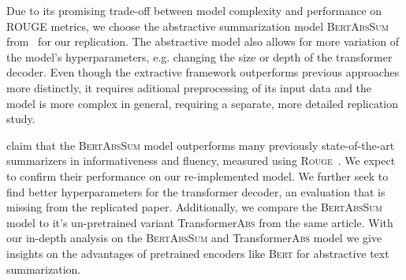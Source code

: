 
Due to its promising trade-off between model complexity and performance on ROUGE metrics, we choose the abstractive summarization model \textsc{BertAbsSum} from~\citeauthor{LiuL2019} for our replication. The abstractive model also allows for more variation of the model's hyperparameters, e.g. changing the size or depth of the transformer decoder. 
Even though the extractive framework outperforms previous approaches more  distinctly, it requires aditional preprocessing of its input data and the model is more complex in general, requiring a separate, more detailed replication study.

\citeauthor{LiuL2019} claim that the \textsc{BertAbsSum} model outperforms many previously state-of-the-art summarizers in informativeness and fluency, measured using \textsc{Rouge}~\cite{LiuL2019,Lin2004}.
We expect to confirm their performance on our re-implemented model.
We further seek to find better hyperparameters for the transformer decoder, an evaluation that is missing from the replicated paper.
Additionally, we compare the \textsc{BertAbsSum} model to it's un-pretrained variant Transformer\textsc{Abs} from the same article.
With our in-depth analysis on the \textsc{BertAbsSum} and Transformer\textsc{Abs} model we give insights on the advantages of pretrained encoders like \textsc{Bert} for abstractive text summarization.
